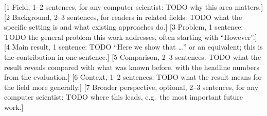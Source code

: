 [1 Field, 1--2 sentences, for any computer scientist: TODO why this area matters.]
[2 Background, 2--3 sentences, for readers in related fields: TODO what the specific setting is and what existing approaches do.]
[3 Problem, 1 sentence: TODO the general problem this work addresses, often starting with \enquote{However}.]
[4 Main result, 1 sentence: TODO \enquote{Here we show that \dots} or an equivalent; this is the contribution in one sentence.]
[5 Comparison, 2--3 sentences: TODO what the result reveals compared with what was known before, with the headline numbers from the evaluation.]
[6 Context, 1--2 sentences: TODO what the result means for the field more generally.]
[7 Broader perspective, optional, 2--3 sentences, for any computer scientist: TODO where this leads, e.g.\ the most important future work.]

\vfill
\selectthesislanguage
